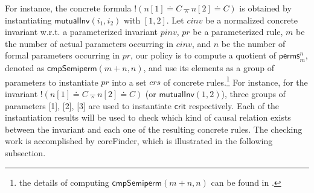 \documentclass[conference]{IEEEtran}
\def \eqc {\doteq }
\def \andc {\barwedge }
\def \negc {!}
\newcommand\lyj[1]{\textcolor{magenta}{#1}}
\newcommand\caicomment[1]{\textcolor{blue}{comment: #1} }
\newcommand{\forget}[1]{}
\begin{document}
{\begin{definition}
\end{definition}
\vspace{-5pt}
\forget{Any normalized $cinv$ containing array variables is obtained by instantiating a parameterized invariant $pinv$ with a parameter list which is an identical permutation $LI$ (i.e., the $j^{th}$ parameter is $j$ itself $LI_{[j]}=j$).} For instance, the concrete formula $\negc (n[1]\eqc C \andc n[2]\eqc C)$ is obtained by instantiating $\mathsf{mutualInv}(i_1,i_2)$ with $[1,2]$. \forget{ Thus, consider a list of parameter $LR$ which is used to instantiate a parameterized rule $pr$, we  have $LR_{[i]}=j$ (or $LR_{[i]}\ne j$) is equivalent to $LR_{[i]}=LI_{[j]}$ (or $LR_{[i]}\ne LI_{[j]}$), %
which is a factor to specify a case by comparing $LR_{[i]}$ with $LI_{[j]}$. This will be the key idea used to  generalize the concrete  invariants and causal relations computed by {\sf invFinder}. } %
Let $cinv$  be a normalized concrete invariant w.r.t. a parameterized invariant $pinv$, $pr$ be a parameterized rule, $m$ be the number of actual parameters occurring in $cinv$, and $n$  be the number of formal parameters occurring in $pr$,  our policy is to compute a quotient of $\mathsf{perms}_{m}^{n}$, denoted as $\mathsf{cmpSemiperm}(m+n,n )$, and use its elements as a group of parameters to instantiate $pr$ into a set $crs$ of concrete rules.\footnote{the details of computing $\mathsf{cmpSemiperm}(m+n,n )$ can be found in \cite{LiCache16}.}  For instance, for the invariant $\negc (n[1]\eqc C \andc n[2]\eqc C)$ (or $\mathsf{mutualInv}(1,2)$), three groups of parameters [1], [2], [3] are used to instantiate $\mathsf{crit}$ respectively. Each of the instantiation results %
will be used to check which kind of  causal relation exists between the invariant and  each one of the resulting concrete rules. The checking work is accomplished by {\sf coreFinder}, which is illustrated in the following subsection.


 \forget{Each of the three probed concrete causal relations will be used to generalized  into a symbolic causal relation existing between $\mathsf{crit}$ and $\mathsf{mutualInv}$ in a case formulated by a predicate comparing rule parameters and invariant parameters.}   %

}
\end{document}
